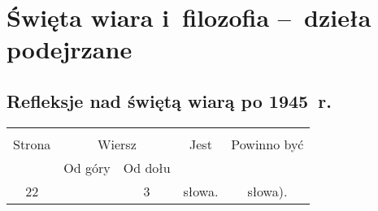 \documentclass[a4paper,11pt]{article}
\begin{document}
\newpage
\section{Święta wiara i~filozofia --~dzieła podejrzane}

\vspace{\spaceTwo}



\subsection{Refleksje nad świętą wiarą po 1945~r.}

\vspace{\spaceThree}






\begin{center}

  \begin{tabular}{|c|c|c|c|c|}
    \hline
    & \multicolumn{2}{c|}{} & & \\
    Strona & \multicolumn{2}{c|}{Wiersz} & Jest
                              & Powinno być \\ \cline{2-3}
    & Od góry & Od dołu & & \\
    \hline
    22  & &  3 & słowa. & słowa). \\
    \hline
  \end{tabular}

\end{center}
\end{document}
